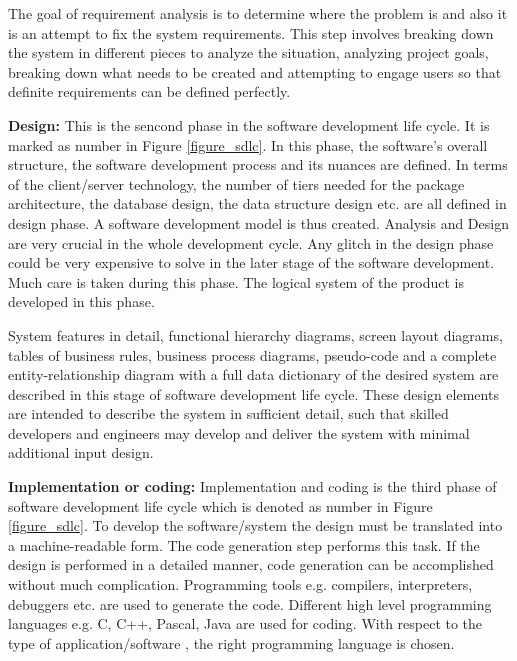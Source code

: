The goal of requirement analysis is to determine where the problem is and also it is an attempt to fix the system requirements. This step involves breaking down the system in different pieces to analyze the situation, analyzing project goals, breaking down what needs to be created and attempting to engage users so that definite requirements can be defined perfectly.

\textbf{ Design:}
This is the sencond phase in the software development life cycle. It is marked as number  in Figure \ref{figure_sdlc}. In this phase, the software's overall structure, the software development process and its nuances are defined. In terms of the client/server technology, the number of tiers needed for the package architecture, the database design, the data structure design etc. are all defined in design phase. A software development model is thus created. Analysis and Design are very crucial in the whole development cycle. Any glitch in the design phase could be very expensive to solve in the later stage of the software development. Much care is taken during this phase. The logical system of the product is developed in this phase.

System features in detail, functional hierarchy diagrams, screen layout diagrams, tables of business rules, business process diagrams, pseudo-code and a complete entity-relationship diagram with a full data dictionary of the desired system are described in this stage of software development life cycle. These design elements are intended to describe the system in sufficient detail, such that skilled developers and engineers may develop and deliver the system with minimal additional input design.

\textbf{ Implementation or coding:}
Implementation and coding is the third phase of software development life cycle which is denoted as number  in Figure \ref{figure_sdlc}. To develop the software/system the design must be translated into a machine-readable form. The code generation step performs this task. If the design is performed in a detailed manner, code generation can be accomplished without much complication. Programming tools e.g. compilers, interpreters, debuggers etc. are used to generate the code. Different high level programming languages e.g. C, C++, Pascal, Java are used for coding. With respect to the type of application/software , the right programming language is chosen.

